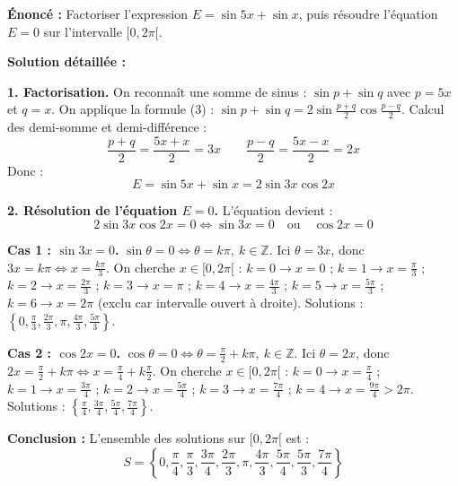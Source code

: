\documentclass[11pt]{article}
\begin{document}
\begin{exoresolu}[{Factoriser et résoudre $\sin 5x + \sin x = 0$ sur $[0, 2\pi[$}]
\textbf{Énoncé :} Factoriser l'expression $E = \sin 5x + \sin x$, puis résoudre l'équation $E = 0$ sur l'intervalle $[0, 2\pi[$.

\textbf{Solution détaillée :}

\noindent\textbf{1. Factorisation.}
On reconnaît une somme de sinus : $\sin p + \sin q$ avec $p = 5x$ et $q = x$.
On applique la formule (3) : $\sin p + \sin q = 2 \sin\frac{p+q}{2} \cos\frac{p-q}{2}$.
Calcul des demi-somme et demi-différence :
\[
\frac{p+q}{2} = \frac{5x+x}{2} = 3x \qquad \frac{p-q}{2} = \frac{5x-x}{2} = 2x
\]
Donc :
\[
E = \sin 5x + \sin x = 2 \sin 3x \cos 2x
\]

\noindent\textbf{2. Résolution de l'équation $E=0$.}
L'équation devient :
\[
2 \sin 3x \cos 2x = 0 \iff \sin 3x = 0 \quad \text{ou} \quad \cos 2x = 0
\]

\noindent\textbf{Cas 1 : $\sin 3x = 0$.}
$\sin \theta = 0 \iff \theta = k\pi,\ k \in \mathbb{Z}$.
Ici $\theta = 3x$, donc $3x = k\pi \iff x = \frac{k\pi}{3}$.
On cherche $x \in [0, 2\pi[$ :
$k=0 \to x=0$ ; $k=1 \to x=\frac{\pi}{3}$ ; $k=2 \to x=\frac{2\pi}{3}$ ; $k=3 \to x=\pi$ ;
$k=4 \to x=\frac{4\pi}{3}$ ; $k=5 \to x=\frac{5\pi}{3}$ ; $k=6 \to x=2\pi$ (exclu car intervalle ouvert à droite).
Solutions : $\left\{0, \frac{\pi}{3}, \frac{2\pi}{3}, \pi, \frac{4\pi}{3}, \frac{5\pi}{3}\right\}$.

\noindent\textbf{Cas 2 : $\cos 2x = 0$.}
$\cos \theta = 0 \iff \theta = \frac{\pi}{2} + k\pi,\ k \in \mathbb{Z}$.
Ici $\theta = 2x$, donc $2x = \frac{\pi}{2} + k\pi \iff x = \frac{\pi}{4} + k\frac{\pi}{2}$.
On cherche $x \in [0, 2\pi[$ :
$k=0 \to x=\frac{\pi}{4}$ ; $k=1 \to x=\frac{3\pi}{4}$ ; $k=2 \to x=\frac{5\pi}{4}$ ; $k=3 \to x=\frac{7\pi}{4}$ ; $k=4 \to x=\frac{9\pi}{4} > 2\pi$.
Solutions : $\left\{\frac{\pi}{4}, \frac{3\pi}{4}, \frac{5\pi}{4}, \frac{7\pi}{4}\right\}$.

\noindent\textbf{Conclusion :}
L'ensemble des solutions sur $[0, 2\pi[$ est :
\[
S = \left\{0, \frac{\pi}{4}, \frac{\pi}{3}, \frac{3\pi}{4}, \frac{2\pi}{3}, \pi, \frac{4\pi}{3}, \frac{5\pi}{4}, \frac{5\pi}{3}, \frac{7\pi}{4}\right\}
\]
\end{exoresolu}
\end{document}
